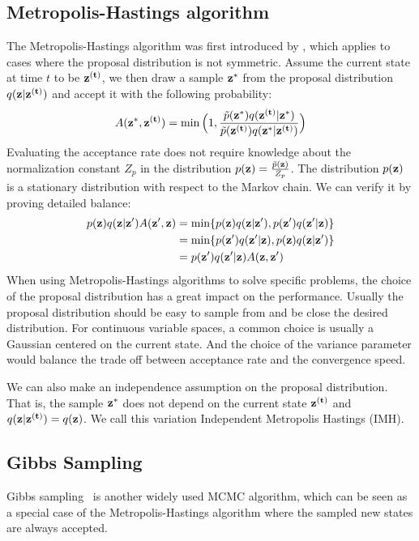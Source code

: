 \subsection{Metropolis-Hastings algorithm}
The Metropolis-Hastings algorithm was first introduced by , which applies to cases where the proposal distribution is not symmetric.
Assume the current state at time $t$ to be ${\bf z^{(t)}}$, we then draw a sample ${\bf z^{*}}$ from the proposal distribution $q({\bf z}| {\bf z^{(t)}})$ and accept it with the following probability:
$$A({\bf z^{*}}, {\bf z^{(t)}})= \min \Big(1, \frac{\tilde{p}({\bf z^{*}})q({\bf z^{(t)}}| {\bf z^{*}})}{\tilde{p}({\bf z^{(t)}})q({\bf z^{*}}| {\bf z^{(t)}})}\Big)$$
Evaluating the acceptance rate does not require knowledge about the normalization constant $Z_p$ in the distribution $p({\bf z})=\frac{\tilde{p}({\bf z})}{Z_p}$. The distribution $p({\bf z})$ is a stationary distribution with respect
to the Markov chain. We can verify it by proving detailed balance:
\begin{equation}
\begin{split}
    p({\bf z}) q({\bf z}|{\bf z'}) A({\bf z'}, {\bf z}) &= \min \{p({\bf z})q({\bf z}|{\bf z'}),p({\bf z'})q({\bf z'}|{\bf z})\} \\ &= \min \{p({\bf z'})q({\bf z'}|{\bf z}), p({\bf z})q({\bf z}|{\bf z'})\} \\ &= p({\bf z'}) q({\bf z'}|{\bf z}) A({\bf z}, {\bf z'})
\end{split}
\end{equation}
When using Metropolis-Hastings algorithms to solve specific problems, the choice of the proposal distribution has a great impact on the performance. 
Usually the proposal distribution should be easy to sample from and be close the desired distribution. For continuous variable spaces, a common choice is usually a Gaussian centered on
the current state. And the choice of the variance parameter would balance the trade off between acceptance rate and the convergence speed.


We can also make an independence assumption on the proposal distribution. That is, the sample ${\bf z^{*}}$ does not depend on the current state ${\bf z^{(t)}}$ and $q({\bf z}| {\bf z^{(t)}}) = q({\bf z})$. We call this variation Independent Metropolis Hastings (IMH).
\subsection{Gibbs Sampling}
Gibbs sampling~\cite{geman1984stochastic} is another widely used MCMC algorithm, which can be seen as a special case of the Metropolis-Hastings algorithm where the sampled new states are always accepted. 



